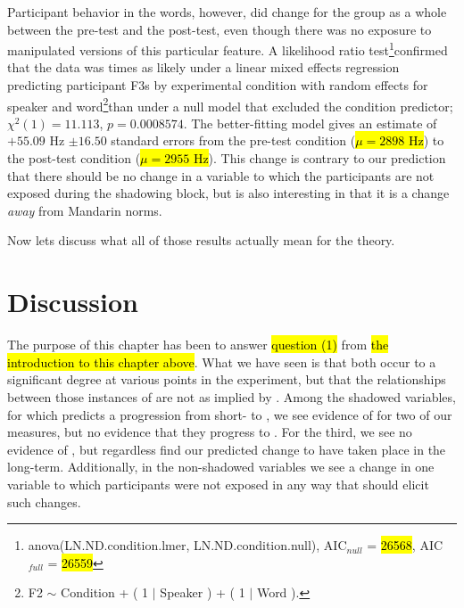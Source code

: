     Participant behavior in the \textipa{[l]/[n]} words, however, did change for the group as a whole between the pre-test and the post-test, even though there was no exposure to manipulated versions of this particular feature. A likelihood ratio test\footnote{anova(LN.ND.condition.lmer, LN.ND.condition.null), AIC$_{null}$ = \hl{26568}, AIC$_{full}$ = \hl{26559}}confirmed that the data was \xxxxx{} times as likely under a linear mixed effects regression predicting participant \ND{} F3s by experimental condition with random effects for speaker and word\footnote{F2 $\sim$ Condition + ( 1 $|$ Speaker ) + ( 1 $|$ Word ).}than under a null model that excluded the condition predictor; $\chi^2 (1) = 11.113$, $p = 0.0008574$. The better-fitting model gives an estimate of $+55.09$ Hz $\pm 16.50$ standard errors from the pre-test condition (\hl{$\mu = 2898$ Hz}) to the post-test condition (\hl{$\mu = 2955$ Hz}). This change is contrary to our prediction that there should be no change in a variable to which the participants are not exposed during the shadowing block, but is also interesting in that it is a change \emph{away} from Mandarin norms. %
    
    Now lets discuss what all of those results actually mean for the theory.

\section{Discussion}
\label{shadowingDiscussion}
    The purpose of this chapter has been to answer \hl{question (1) } from \hl{the introduction to this chapter above}. What we have seen is that both \sla{} occur to a significant degree at various points in the experiment, but that the relationships between those instances of \sla{} are not as implied by \cbat{}. Among the shadowed variables, for which \cbat{} predicts a progression from short- to \lta{}, we see evidence of \sta{} for two of our measures, but no evidence that they progress to \lta{}. For the third, we see no evidence of \sta{}, but regardless find our predicted change to have taken place in the long-term. Additionally, in the non-shadowed variables we see a change in one variable to which participants were not exposed in any way that should elicit such changes.
    
